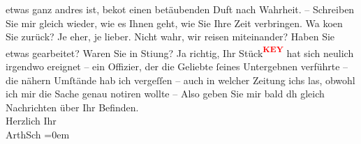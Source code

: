 \begin{ledgroupsized}[t]{13cm}
               etwas ganz andres ist, beko{\geminationm}t {\pb}einen betäubenden Duft nach
               Wahrheit. – Schreiben Sie mir gleich wieder, wie es Ihnen geht, wie Sie Ihre Zeit
               verbringen. Wa{\geminationn} ko{\geminationm}en Sie
               zurück? Je eher, je lieber. Nicht wahr, wir reisen miteinander? Haben {\pb}Sie etwas gearbeitet? Waren Sie in
                  Sti{\geminationm}ung? Ja richtig, Ihr Stück\textcolor{red}{\textsuperscript{\textbf{KEY}}} hat sich neulich irgendwo ereignet – ein Offizier,
               der die Geliebte ſeines Untergebnen verführte – die nähern Umſtände hab ich vergeſſen
               – auch {\pb}in welcher Zeitung ichs
               las, obwohl ich mir die Sache genau notiren wollte – \pend
           \pstart
           Also geben Sie mir bald dh gleich Nachrichten über Ihr Befinden. {\\[\baselineskip]}Herzlich
               Ihr {\\[\baselineskip]}\spacefill\mbox{ArthSch}\pend
           \leftskip=0em{}
         
         \endnumbering{}\end{ledgroupsized}\begin{anhang}\end{anhang}\newcommand{\dateiname}{L02951}\newcommand{\titel}{Arthur Schnitzler an Felix Salten, [10.? 9. 1891]}\newcommand{\editorInnen}{Martin Anton Müller und Laura Untner}
      